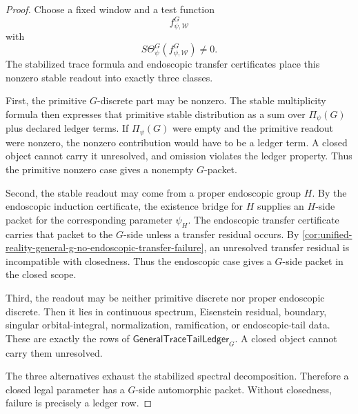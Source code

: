 \begin{proof}
Choose a fixed window and a test function
$$
f_{\psi,\mathcal W}^G
$$
with
$$
S\Theta_\psi^G(f_{\psi,\mathcal W}^G)\ne0.
$$
The stabilized trace formula and endoscopic transfer certificates place
this nonzero stable readout into exactly three classes.

First, the primitive $G$-discrete part may be nonzero. The stable
multiplicity formula then expresses that primitive stable distribution
as a sum over $\Pi_\psi(G)$ plus declared ledger terms. If
$\Pi_\psi(G)$ were empty and the primitive readout were nonzero, the
nonzero contribution would have to be a ledger term. A closed object
cannot carry it unresolved, and omission violates the ledger property.
Thus the primitive nonzero case gives a nonempty $G$-packet.

Second, the stable readout may come from a proper endoscopic group
$H$. By the endoscopic induction certificate, the existence bridge for
$H$ supplies an $H$-side packet for the corresponding parameter
$\psi_H$. The endoscopic transfer certificate carries that packet to
the $G$-side unless a transfer residual occurs. By
\autoref{cor:unified-reality-general-g-no-endoscopic-transfer-failure},
an unresolved transfer residual is incompatible with closedness. Thus
the endoscopic case gives a $G$-side packet in the closed scope.

Third, the readout may be neither primitive discrete nor proper
endoscopic discrete. Then it lies in continuous spectrum, Eisenstein
residual, boundary, singular orbital-integral, normalization,
ramification, or endoscopic-tail data. These are exactly the rows of
$\mathsf{GeneralTraceTailLedger}_G$. A closed object cannot carry them
unresolved.

The three alternatives exhaust the stabilized spectral decomposition.
Therefore a closed legal parameter has a $G$-side automorphic packet.
Without closedness, failure is precisely a ledger row.
\end{proof}


